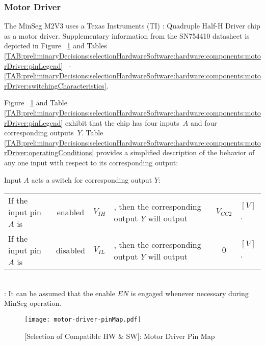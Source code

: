 \documentclass[crop=false,float=true,class=scrreprt]{standalone}
\begin{document}
\subsubsection{Motor Driver}
\label{SEC:preliminaryDecisions:selectionHardwareSoftware:hardware:components:motorDriver}

The MinSeg M2V3 uses a Texas Instruments (TI) : Quadruple Half-H Driver chip as a motor driver.
Supplementary information from the SN754410 datasheet is depicted in Figure~%
\ref{FIG:preliminaryDecisions:selectionHardwareSoftware:hardware:components:motorDriver:pinMap}
and Tables
\ref{TAB:preliminaryDecisions:selectionHardwareSoftware:hardware:components:motorDriver:pinLegend}~%
-~%
\ref{TAB:preliminaryDecisions:selectionHardwareSoftware:hardware:components:motorDriver:switchingCharacteristics}.

Figure~%
\ref{FIG:preliminaryDecisions:selectionHardwareSoftware:hardware:components:motorDriver:pinMap}
and Table~%
\ref{TAB:preliminaryDecisions:selectionHardwareSoftware:hardware:components:motorDriver:pinLegend}
exhibit that the chip has four inputs~$A$ and four corresponding outputs~$Y$.
Table~%
\ref{TAB:preliminaryDecisions:selectionHardwareSoftware:hardware:components:motorDriver:operatingConditions}
provides a simplified description of the behavior 
of any one input with respect to its corresponding output:

Input $A$ acts a switch for corresponding output $Y$:\\
\begin{tabular}{@{$\bullet$\ } l @{\ } c @{\ } c @{} l @{\ } c @{\ } l}
If the input pin $A$ is & enabled  & $V_{IH}$ &, then the corresponding output $Y$ will output & $V_{CC2}$ & $[V]$.\\[-0.0em]
If the input pin $A$ is & disabled & $V_{IL}$ &, then the corresponding output $Y$ will output & $0$       & $[V]$.
\end{tabular}\\[+0.5em]
{\fns {}: It can be assumed that the enable $EN$ is engaged whenever necessary during MinSeg operation.}


\vspace*{\fill}


\begin{figure}[H]%
\centering%
\texttt{[image: motor-driver-pinMap.pdf]}%
\caption[{[Selection of Compatible HW \& SW]: Motor Driver Pin Map}]%
        {{[Selection of Compatible HW \& SW]: Motor Driver Pin Map~%
           \cite{REF:online:ti:datasheet:sn754410}%
           \label{FIG:preliminaryDecisions:selectionHardwareSoftware:hardware:components:motorDriver:pinMap}%
        }}%
\end{figure}
\end{document}
